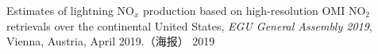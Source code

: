 \begin{cvpresentations}

\publication
{ Estimates of lightning NO$_x$ production based on high-resolution OMI NO$_2$ retrievals over the continental United States,
\emph{EGU General Assembly 2019},
Vienna, Austria, April 2019.（海报）} %
{2019} %

\end{cvpresentations}
